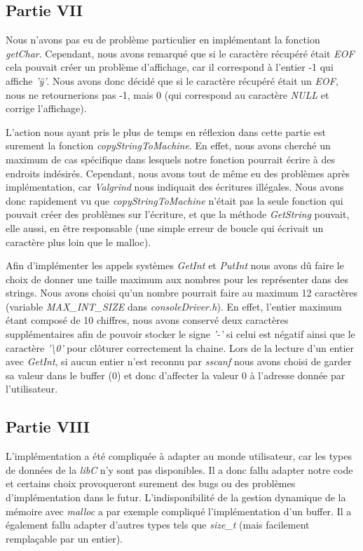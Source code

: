 \documentclass{article}
\begin{document}
\subsection{Partie VII} \label{bugPartieVII}
Nous n'avons pas eu de problème particulier en implémentant la fonction
\textit{getChar}. Cependant, nous avons remarqué que si le caractère récupéré
était \textit{EOF} cela pouvait créer un problème d'affichage, car il
correspond à l'entier -1 qui affiche \textit{'ÿ'}. Nous avons donc décidé que
si le caractère récupéré était un \textit{EOF}, nous ne retournerions pas -1,
mais 0 (qui correspond au caractère \textit{NULL} et corrige l'affichage).

L'action nous ayant pris le plus de temps en réflexion dans cette partie est
surement la fonction \textit{copyStringToMachine}. En effet, nous avons cherché
un maximum de cas spécifique dans lesquels notre fonction pourrait écrire à des
endroits indésirés. Cependant, nous avons tout de même eu des problèmes après
implémentation, car \textit{Valgrind} nous indiquait des écritures illégales.
Nous avons donc rapidement vu que \textit{copyStringToMachine} n'était pas la
seule fonction qui pouvait créer des problèmes sur l'écriture, et que la
méthode \textit{GetString} pouvait, elle aussi, en être responsable (une simple
erreur de boucle qui écrivait un caractère plus loin que le malloc).

Afin d'implémenter les appels systèmes \textit{GetInt} et \textit{PutInt} nous avons dû
faire le choix de donner une taille maximum aux nombres pour les représenter dans des strings.
Nous avons choisi qu'un nombre pourrait faire au maximum 12 caractères (variable \textit{MAX\_INT\_SIZE} dans
\textit{consoleDriver.h}). En effet, l'entier maximum
étant composé de 10 chiffres, nous avons conservé deux caractères supplémentaires afin de pouvoir stocker
le signe \textit{'-'} si celui est négatif ainsi que le caractère \textit{'\textbackslash0'} pour clôturer correctement
la chaine. Lors de la lecture d'un entier avec \textit{GetInt}, si aucun entier n'est reconnu par
\textit{sscanf} nous avons choisi de garder sa valeur dans le buffer (0) et donc d'affecter la valeur 0 à l'adresse
donnée par l'utilisateur.

\subsection{Partie VIII}
L'implémentation a été compliquée à adapter au monde utilisateur, car les types de données de la \textit{libC} n'y sont pas disponibles.
Il a donc fallu adapter notre code et certains choix provoqueront surement des bugs ou des problèmes d'implémentation dans le futur. L'indisponibilité
de la gestion dynamique de la mémoire avec \textit{malloc} a par exemple compliqué l'implémentation d'un buffer. Il a également fallu adapter d'autres
types tels que \textit{size\_t} (mais facilement remplaçable par un entier).
\end{document}
